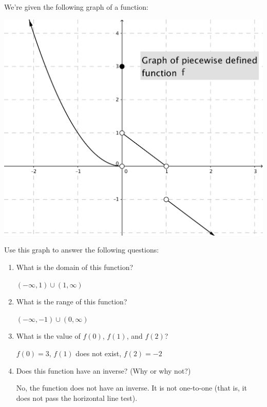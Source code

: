 \documentclass[nooutcomes]{ximera}
\begin{document}
\begin{problem}

  We're given the following graph of a function:
  \begin{image}
    \includegraphics[scale = 0.3]{figure1.png}
  \end{image}
  Use this graph to answer the following questions:
  \begin{enumerate}
    \item
      What is the domain of this function?
      \begin{freeResponse}
        $(-\infty, 1) \cup (1, \infty)$
      \end{freeResponse}
      
    \item
      What is the range of this function?
      \begin{freeResponse}
        $(-\infty, -1) \cup (0, \infty)$
      \end{freeResponse}

    \item
      What is the value of $f(0)$, $f(1)$, and $f(2)$?
      \begin{freeResponse}
        $f(0) = 3$, $f(1)$ does not exist, $f(2) = -2$
      \end{freeResponse}

    \item
      Does this function have an inverse?
      (Why or why not?)
      \begin{freeResponse}
        No, the function does not have an inverse.
        It is not one-to-one (that is, it does not pass the horizontal line test).
      \end{freeResponse}
      

\end{enumerate}
\end{problem}
\end{document}
